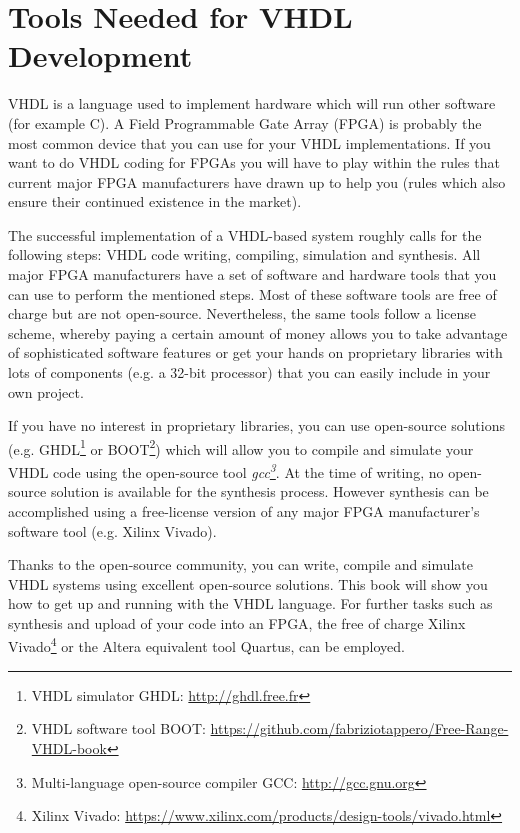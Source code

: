 \section{Tools Needed for VHDL Development}
VHDL is a language used to implement hardware which will run other software (for example C). A Field Programmable Gate Array (FPGA) is probably the most common device that you can use for your VHDL implementations. If you want to do VHDL coding for FPGAs you will have to play within the rules that current major FPGA manufacturers have drawn up to help you (rules which also ensure their continued existence in the market).

The successful implementation of a VHDL-based system roughly calls for the following steps: VHDL code writing, compiling, simulation and synthesis. All major FPGA manufacturers have a set of software and hardware tools that you can use to perform the mentioned steps. Most of these software tools are free of charge but are not open-source. Nevertheless, the same tools follow a license scheme, whereby paying a certain amount of money allows you to take advantage of sophisticated software features or get your hands on proprietary libraries with lots of components (e.g. a 32-bit processor) that you can easily include in your own project.

If you have no interest in proprietary libraries, you can use open-source solutions (e.g. GHDL\footnote{VHDL simulator GHDL: {\footnotesize\url{http://ghdl.free.fr}}} or BOOT\footnote{VHDL software tool BOOT: {\footnotesize\url{https://github.com/fabriziotappero/Free-Range-VHDL-book}}}) which will allow you to compile and simulate your VHDL code using the open-source tool \textit{gcc\footnote{Multi-language open-source compiler GCC: {\footnotesize\url{http://gcc.gnu.org}}}}. At the time of writing, no open-source solution is available for the synthesis process. However synthesis can be accomplished using a free-license version of any major FPGA manufacturer's software tool (e.g. Xilinx Vivado).

Thanks to the open-source community, you can write, compile and simulate VHDL systems using excellent open-source solutions. This book will show you how to get up and running with the VHDL language. For further tasks such as synthesis and upload of your code into an FPGA, the free of charge Xilinx Vivado\footnote{Xilinx Vivado: {\scriptsize\url{https://www.xilinx.com/products/design-tools/vivado.html}}} or the Altera equivalent tool Quartus, can be employed.
